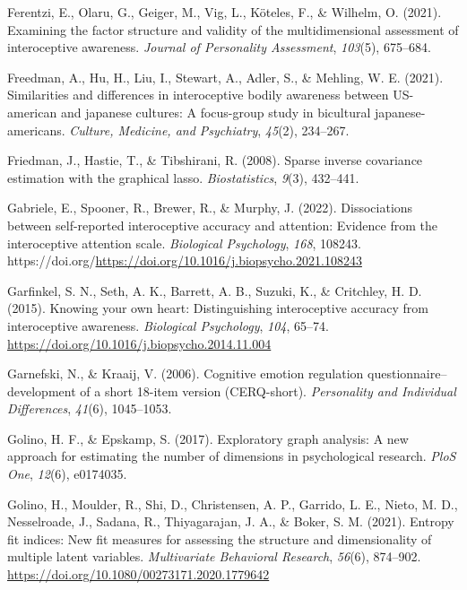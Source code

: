 \documentclass[
  man,
  floatsintext,
  longtable,
  nolmodern,
  notxfonts,
  notimes,
  mask,
  colorlinks=true,linkcolor=blue,citecolor=blue,urlcolor=blue]{apa7}
\newlength{\cslhangindent}
\newenvironment{CSLReferences}[2] %
 {\begin{list}{}{%
  \setlength{\itemindent}{0pt}
  \setlength{\leftmargin}{0pt}
  \setlength{\parsep}{0pt}
  \ifodd #1
   \setlength{\leftmargin}{\cslhangindent}
   \setlength{\itemindent}{-1\cslhangindent}
  \fi
  \setlength{\itemsep}{#2\baselineskip}}}
 {\end{list}}
\begin{document}
\begin{CSLReferences}{1}{0}
Ferentzi, E., Olaru, G., Geiger, M., Vig, L., Köteles, F., \& Wilhelm,
O. (2021). Examining the factor structure and validity of the
multidimensional assessment of interoceptive awareness. \emph{Journal of
Personality Assessment}, \emph{103}(5), 675--684.

Freedman, A., Hu, H., Liu, I., Stewart, A., Adler, S., \& Mehling, W. E.
(2021). Similarities and differences in interoceptive bodily awareness
between US-american and japanese cultures: A focus-group study in
bicultural japanese-americans. \emph{Culture, Medicine, and Psychiatry},
\emph{45}(2), 234--267.

Friedman, J., Hastie, T., \& Tibshirani, R. (2008). Sparse inverse
covariance estimation with the graphical lasso. \emph{Biostatistics},
\emph{9}(3), 432--441.

Gabriele, E., Spooner, R., Brewer, R., \& Murphy, J. (2022).
Dissociations between self-reported interoceptive accuracy and
attention: Evidence from the interoceptive attention scale.
\emph{Biological Psychology}, \emph{168}, 108243.
https://doi.org/\url{https://doi.org/10.1016/j.biopsycho.2021.108243}

Garfinkel, S. N., Seth, A. K., Barrett, A. B., Suzuki, K., \& Critchley,
H. D. (2015). Knowing your own heart: Distinguishing interoceptive
accuracy from interoceptive awareness. \emph{Biological Psychology},
\emph{104}, 65--74.
\url{https://doi.org/10.1016/j.biopsycho.2014.11.004}

Garnefski, N., \& Kraaij, V. (2006). Cognitive emotion regulation
questionnaire--development of a short 18-item version (CERQ-short).
\emph{Personality and Individual Differences}, \emph{41}(6), 1045--1053.

Golino, H. F., \& Epskamp, S. (2017). Exploratory graph analysis: A new
approach for estimating the number of dimensions in psychological
research. \emph{PloS One}, \emph{12}(6), e0174035.

Golino, H., Moulder, R., Shi, D., Christensen, A. P., Garrido, L. E.,
Nieto, M. D., Nesselroade, J., Sadana, R., Thiyagarajan, J. A., \&
Boker, S. M. (2021). Entropy fit indices: New fit measures for assessing
the structure and dimensionality of multiple latent variables.
\emph{Multivariate Behavioral Research}, \emph{56}(6), 874--902.
\url{https://doi.org/10.1080/00273171.2020.1779642}


\end{CSLReferences}
\end{document}
